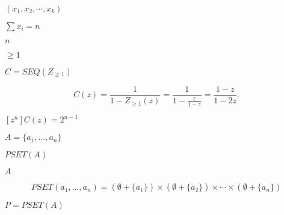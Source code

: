 \documentclass[10pt]{book}
\begin{document}
\begin{mdSnippets}
\begin{mdInlineSnippet}%
$(x_1,x_2,\cdots,x_k)$\end{mdInlineSnippet}%
\begin{mdInlineSnippet}[4edcda6935374226723f6450855eb43b]%
$\sum x_i = n$\end{mdInlineSnippet}%
\begin{mdInlineSnippet}[7b8b965ad4bca0e41ab51de7b31363a1]%
$n$\end{mdInlineSnippet}%
\begin{mdInlineSnippet}[190e98cf0a6ba7a8b6ed2eafbfb4e8ea]%
$\geq 1$\end{mdInlineSnippet}%
\begin{mdInlineSnippet}%
$C=SEQ(Z_{\geq1})$\end{mdInlineSnippet}%
\begin{mdDisplaySnippet}[36219a14f7414d3c3884512d6012ec17]%
\[%
 C(z)=\frac{1}{1-Z_{\geq1}(z)}=\frac{1}{1-\frac{z}{1-z}}=\frac{1-z}{1-2z}.
\]%
\end{mdDisplaySnippet}%
\begin{mdInlineSnippet}[4bb8eae0518784707e4f9d6a8d60e295]%
$[z^n]C(z)=2^{n-1}$\end{mdInlineSnippet}%
\begin{mdInlineSnippet}[6ab6af6d3b29917fa077422bcdbe8917]%
$A=\{a_1,...,a_n\}$\end{mdInlineSnippet}%
\begin{mdInlineSnippet}%
$PSET(A)$\end{mdInlineSnippet}%
\begin{mdInlineSnippet}[7fc56270e7a70fa81a5935b72eacbe29]%
$A$\end{mdInlineSnippet}%
\begin{mdDisplaySnippet}%
\[%
PSET(a_1,\ldots,a_n) = (\emptyset+\{a_1\})\times(\emptyset+\{a_2\})\times\cdots\times(\emptyset + \{a_n\})
\]%
\end{mdDisplaySnippet}%
\begin{mdInlineSnippet}%
$P=PSET(A)$\end{mdInlineSnippet}%

\end{mdSnippets}
\end{document}
